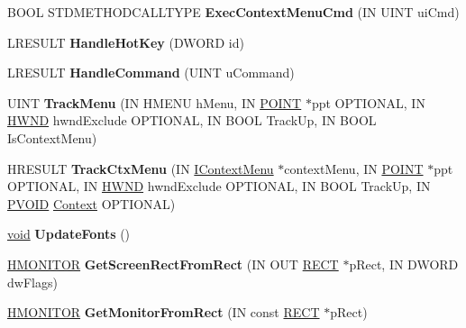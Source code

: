 \begin{DoxyCompactItemize}
B\+O\+OL S\+T\+D\+M\+E\+T\+H\+O\+D\+C\+A\+L\+L\+T\+Y\+PE {\bfseries Exec\+Context\+Menu\+Cmd} (IN U\+I\+NT ui\+Cmd)
\item 
\mbox{\label{class_c_tray_window_aa29721112fbac60999a8d5803c640a0b}} 
L\+R\+E\+S\+U\+LT {\bfseries Handle\+Hot\+Key} (D\+W\+O\+RD id)
\item 
\mbox{\label{class_c_tray_window_a2b2765a426b9951ecfe9fa459b993e77}} 
L\+R\+E\+S\+U\+LT {\bfseries Handle\+Command} (U\+I\+NT u\+Command)
\item 
\mbox{\label{class_c_tray_window_adef83bb8948834754a33993c9c367218}} 
U\+I\+NT {\bfseries Track\+Menu} (IN H\+M\+E\+NU h\+Menu, IN \hyperlink{structtag_p_o_i_n_t}{P\+O\+I\+NT} $\ast$ppt O\+P\+T\+I\+O\+N\+AL, IN \hyperlink{interfacevoid}{H\+W\+ND} hwnd\+Exclude O\+P\+T\+I\+O\+N\+AL, IN B\+O\+OL Track\+Up, IN B\+O\+OL Is\+Context\+Menu)
\item 
\mbox{\label{class_c_tray_window_ae7622e8f205634938c6b28e8e36ee7bd}} 
H\+R\+E\+S\+U\+LT {\bfseries Track\+Ctx\+Menu} (IN \hyperlink{interface_i_context_menu}{I\+Context\+Menu} $\ast$context\+Menu, IN \hyperlink{structtag_p_o_i_n_t}{P\+O\+I\+NT} $\ast$ppt O\+P\+T\+I\+O\+N\+AL, IN \hyperlink{interfacevoid}{H\+W\+ND} hwnd\+Exclude O\+P\+T\+I\+O\+N\+AL, IN B\+O\+OL Track\+Up, IN \hyperlink{interfacevoid}{P\+V\+O\+ID} \hyperlink{struct_context}{Context} O\+P\+T\+I\+O\+N\+AL)
\item 
\mbox{\label{class_c_tray_window_aa1aa30f18a1988bef9c516ebe6ce451c}} 
\hyperlink{interfacevoid}{void} {\bfseries Update\+Fonts} ()
\item 
\mbox{\label{class_c_tray_window_a31d667302b5a3a63a6583e9179460966}} 
\hyperlink{interfacevoid}{H\+M\+O\+N\+I\+T\+OR} {\bfseries Get\+Screen\+Rect\+From\+Rect} (IN O\+UT \hyperlink{structtag_r_e_c_t}{R\+E\+CT} $\ast$p\+Rect, IN D\+W\+O\+RD dw\+Flags)
\item 
\mbox{\label{class_c_tray_window_ade606c61fc5754f696273897824acbec}} 
\hyperlink{interfacevoid}{H\+M\+O\+N\+I\+T\+OR} {\bfseries Get\+Monitor\+From\+Rect} (IN const \hyperlink{structtag_r_e_c_t}{R\+E\+CT} $\ast$p\+Rect)

\end{DoxyCompactItemize}

